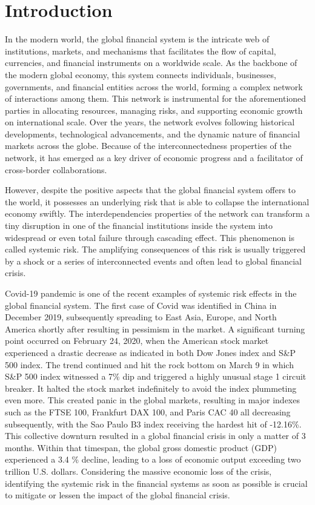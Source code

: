 \documentclass[a4paper,11pt]{article}
\begin{document}
\section{Introduction}
In the modern world, the global financial system is the intricate web of institutions, markets, and mechanisms that facilitates the flow of capital, currencies, and financial instruments on a worldwide scale. As the backbone of the modern global economy, this system connects individuals, businesses, governments, and financial entities across the world, forming a complex network of interactions among them. This network is instrumental for the aforementioned parties in allocating resources, managing risks, and supporting economic growth on international scale. Over the years, the network evolves following historical developments, technological advancements, and the dynamic nature of financial markets across the globe. Because of the interconnectedness properties of the network, it has emerged as a key driver of economic progress and a facilitator of cross-border collaborations.

However, despite the positive aspects that the global financial system offers to the world, it possesses an underlying risk that is able to collapse the international economy swiftly. The interdependencies properties of the network can transform a tiny disruption in one of the financial institutions inside the system into widespread or even total failure through cascading effect. This phenomenon is called systemic risk. The amplifying consequences of this risk is usually triggered by a shock or a series of interconnected events and often lead to global financial crisis.

Covid-19 pandemic is one of the recent examples of systemic risk effects in the global financial system. The first case of Covid was identified in China in December 2019, subsequently spreading to East Asia, Europe, and North America shortly after resulting in pessimism in the market. A significant turning point occurred on February 24, 2020, when the American stock market experienced a drastic decrease as indicated in both Dow Jones index and S\&P 500 index. The trend continued and hit the rock bottom on March 9 in which S\&P 500 index witnessed a 7\% dip and triggered a highly unusual stage 1 circuit breaker. It halted the stock market indefinitely to avoid the index plummeting even more. This created panic in the global markets, resulting in major indexes such as the FTSE 100, Frankfurt DAX 100, and Paris CAC 40 all decreasing subsequently, with the Sao Paulo B3 index receiving the hardest hit of -12.16\%. This collective downturn resulted in a global financial crisis in only a matter of 3 months. Within that timespan, the global gross domestic product (GDP) experienced a 3.4 \% decline, leading to a loss of economic output exceeding two trillion U.S. dollars. Considering the massive economic loss of the crisis, identifying the systemic risk in the financial systems as soon as possible is crucial to mitigate or lessen the impact of the global financial crisis.
\end{document}
